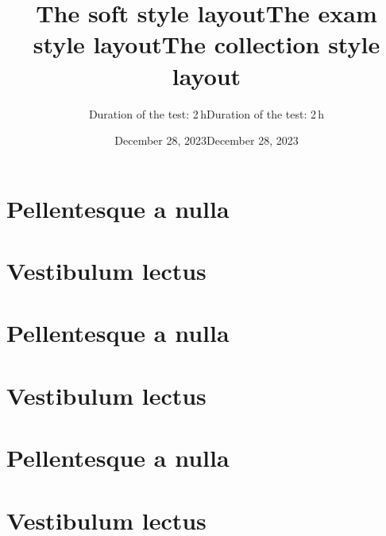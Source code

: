 \documentclass[a4paper,11pt]{article}
\begin{document}
\newpage
\hypertarget{schooldocs-example-soft}{}

\setcounter{page}{1}
\setcounter{section}{0}
\pagestyle{soft}
\title[The soft style]{The soft style layout}
\maketitle
\section*{Pellentesque a nulla}
\lipsum[1-3]
\section*{Vestibulum lectus}
\lipsum[5-9]

\newpage
\hypertarget{schooldocs-example-exam}{}

\setcounter{page}{1}
\setcounter{section}{0}
\selectfont 
\pagestyle{exam}
\title[The exam style]{The exam style layout}
\date{December 28, 2023}
\subtitle{Duration of the test: 2\,h}
\maketitle
\section*{Pellentesque a nulla}
\lipsum[1-3]
\section*{Vestibulum lectus}
\lipsum[5-9]

\newpage
\hypertarget{schooldocs-example-examcorrect}{}

\setcounter{page}{1}
\setcounter{section}{0}
\correct
\maketitle
\section*{Pellentesque a nulla}
\lipsum[1-3]
\section*{Vestibulum lectus}
\lipsum[5-9]

\newpage
\hypertarget{schooldocs-example-collection}{}

\setcounter{page}{1}
\setcounter{section}{0}
\selectfont
\pagestyle{collection}
\title[The collection style]{The collection style layout}
\date{December 28, 2023}
\subtitle{Duration of the test: 2\,h}
\maketitle
\end{document}
